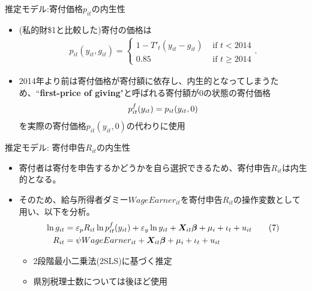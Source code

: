 \documentclass[dvipdfmx,10pt]{beamer}
\begin{document}
\begin{frame}{推定モデル:寄付価格$p_{it}$の内生性}
	\begin{itemize}
		\item (私的財\$1と比較した)寄付の価格は
		\begin{align}
			p_{it}(y_{it}, g_{it})=\begin{cases}
			1-T'_t(y_{it}-g_{it})&\text{ if }t<2014\\
			0.85&\text{ if }t\ge2014
			\end{cases}
			\tag{6'}.
		\end{align}
		\item 2014年より前は寄付価格が寄付額に依存し、内生的となってしまうため、``\textbf{first-price of giving}"と呼ばれる寄付額が0の状態の寄付価格
		\begin{align}
			p_{it}^f(y_{it})=p_{it}(y_{it},0)\notag
		\end{align}
		を実際の寄付価格$p_{it}(y_{it},0)$の代わりに使用
	\end{itemize}
\end{frame}

\begin{frame}{推定モデル: 寄付申告$R_{it}$の内生性}
	\begin{itemize}
		\item 寄付者は寄付を申告するかどうかを自ら選択できるため、寄付申告$R_{it}$は内生的となる。
		\item そのため、給与所得者ダミー$WageEarner_{it}$を寄付申告$R_{it}$の操作変数として用い、以下を分析。
		\begin{align}
			\ln g_{it} &= \varepsilon_pR_{it} \ln p_{it}^f(y_{it}) + \varepsilon_y \ln y_{it} + \bm{X}_{it}\bm{\beta} + \mu_i + \iota_t + u_{it}\tag{7}\\
			R_{it} &=\psi WageEarner_{it}+\bm{X}_{it}\bm{\beta} + \mu_i + \iota_t + u_{it}\notag
		\end{align} 
	 	\begin{itemize}
	 		\item 2段階最小二乗法(2SLS)に基づく推定
			\item 県別税理士数については後ほど使用
		\end{itemize}
	\end{itemize}
\end{frame}
\end{document}

